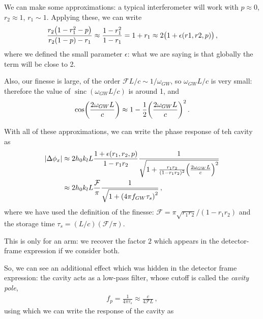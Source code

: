 \documentclass[main.tex]{subfiles}
\begin{document}
We can make some approximations: a typical interferometer will work with \(p \approx 0 \), \(r_2 \approx 1\), \(r_1 \sim 1\). Applying these, we can write  
%
\begin{align}
\frac{r_2 \qty(1 - r_1^2 - p )}{r_2 (1 - p) - r_1 } \approx \frac{1 - r_1^2}{1 - r_1 } =  1 + r_1 \approx 2 \qty(1 + \epsilon (r1, r2, p))
\,,
\end{align}
%
where we defined the small parameter \(\epsilon \): what we are saying is that globally the term will be close to 2. 

Also, our finesse is large, of the order \(\mathcal{F} L / c \sim 1 / \omega_{GW}\), so \(\omega_{GW} L / c\) is very small: therefore the value of \(\operatorname{sinc} (\omega_{GW} L / c)\) is around 1, and 
%
\begin{align}
\cos(\frac{2 \omega_{GW} L}{c})\approx 1 - \frac{1}{2} \qty(\frac{2 \omega_{GW}L }{c})^2
\,.
\end{align}

With all of these approximations, we can write the phase response of teh cavity as 
%
\begin{align}
\abs{\Delta \phi_{x}} &\approx 2 h_0 k_l L \frac{1 + \epsilon (r_1, r_2, p)}{1 - r_1 r_2 } \frac{1}{\sqrt{1 + \frac{r_1 r_2 }{(1 - r_1 r_2 )^2} \qty( \frac{2 \omega_{GW} L}{c})^2}}  \\
&\approx 2 h_0 k_l L \frac{\mathcal{F}}{\pi } \frac{1}{\sqrt{1 + \qty(4 \pi f_{GW} \tau_{s})^2}}
\,,
\end{align}
%
where we have used the definition of the finesse: \(\mathcal{F} = \pi \sqrt{r_1 r_2 } / (1 - r_1 r_2 )\) and the storage time \(\tau_{s} = (L/c)(\mathcal{F} / \pi )\).  

This is only for an arm: we recover the factor \(2\) which appears in the detector-frame expression if we consider both. 

So, we can see an additional effect which was hidden in the detector frame expression: the cavity acts as a low-pass filter, whose cutoff is called the \emph{cavity pole}, 
%
\begin{align}
f_p = \frac{1}{4 \pi \tau_{s}} \approx \frac{c}{4 \mathcal{F}L} 
\,,
\end{align}
%
using which we can write the response of the cavity as 
%
\end{document}
